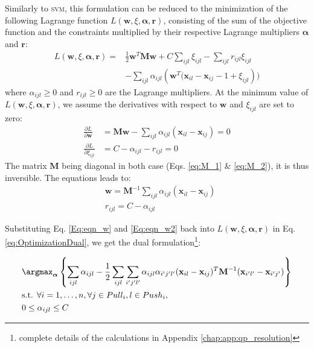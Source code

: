 \noindent Similarly to \textsc{svm}, this formulation can be reduced to the minimization of the following Lagrange function $L(\textbf{w},\xi,\boldsymbol{\alpha},\textbf{r})$, consisting of the sum of the objective function and the constraints multiplied by their respective Lagrange multipliers $\boldsymbol{\alpha}$ and $\textbf{r}$:
\begin{equation}
\begin{aligned}
L(\textbf{w},\xi,\boldsymbol{\alpha},\textbf{r}) 
= & 
\frac{1}{2} \textbf{w}^T \textbf{M} \textbf{w}
+ C \sum\limits_{ijl} \xi_{ijl} - \sum\limits_{ijl}r_{ijl} \xi_{ijl} \\
&  - \sum\limits_{ijl} \alpha_{ijl}\left( \textbf{w}^T(\textbf{x}_{il}-\textbf{x}_{ij}-1+\xi_{ijl} \right))
\label{eq:OptimizationDual}
\end{aligned}
\end{equation}
\noindent where $\alpha_{ijl} \geq 0$ and $r_{ijl} \geq 0$ are the Lagrange multipliers. At the minimum value of $L(\textbf{w},\xi,\boldsymbol{\alpha},\textbf{r})$, we assume the derivatives with respect to $\textbf{w}$ and $\xi_{ijl}$ are set to zero:
\begin{align*}
	\frac{\partial L}{\partial \textbf{w}} 
	& = 
	\textbf{M} \textbf{w} 
	- \sum\limits_{ijl} \alpha_{ijl}(\textbf{x}_{il}-\textbf{x}_{ij}) 
	= 0 \\
	\frac{\partial L}{\partial \xi_{ijl}} & = C - \alpha_{ijl} - r_{ijl} = 0
\end{align*}
\noindent The matrix $\textbf{M}$ being diagonal in both case (Eqs. \ref{eq:M_1} \& \ref{eq:M_2}), it is thus inversible. The equations leads to:
\begin{align}
	& \textbf{w} = \textbf{M}^{-1}  
	\sum\limits_{ijl} \alpha_{ijl}(\textbf{x}_{il}-\textbf{x}_{ij}) \label{Eq:eqn_w} 
	\\ 
	& r_{ijl} = C - \alpha_{ijl} \label{Eq:eqn_w2}
\end{align}

\noindent Substituting Eq. \ref{Eq:eqn_w} and \ref{Eq:eqn_w2} back into $L(\textbf{w},\xi,\boldsymbol{\alpha},\textbf{r})$ in Eq. \ref{eq:OptimizationDual}, we get the dual formulation\footnote{complete details of the calculations in Appendix \ref{chap:app:qp_resolution}}:

\begin{equation}
	\begin{aligned}
	&\displaystyle \argmax_{\boldsymbol{\alpha}} \left\lbrace 
	\sum\limits_{ijl} \alpha_{ijl} 
	- \frac{1}{2} \sum\limits_{ijl} \sum\limits_{i'j'l'}
	\alpha_{ijl} \alpha_{i'j'l'}
	(\textbf{x}_{il}-\textbf{x}_{ij})^T
	\textbf{M}^{-1}
	(\textbf{x}_{i'l'}-\textbf{x}_{i'j'}) \right\rbrace \\
	&\text{s.t.  } \forall i = 1, \ldots, n, \forall j \in Pull_i, l \in Push_i, \\
	& 0 \leq \alpha_{ijl} \leq C
	\end{aligned}
	\label{eq:OptimDual}
\end{equation}


